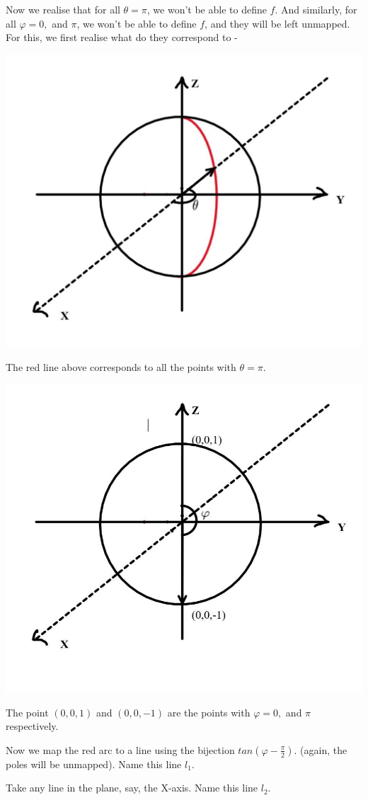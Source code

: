 \documentclass[12pt]{scrartcl}
\begin{document}
Now we realise that for all $\theta = \pi$, we won't be able to define $f$. And similarly, for all $\varphi = 0,$ and $\pi$, we won't be able to define $f$, and they will be left unmapped. For this, we first realise what do they correspond to - 
\begin{center}
    \includegraphics[width=0.7\linewidth]{photo_2020-10-31_16-28-07.jpg}
\end{center}
The red line above corresponds to all the points with $\theta = \pi$.
\begin{center}
    \includegraphics[width=0.7\linewidth]{photo_2020-10-31_16-32-03.jpg}
\end{center}
The point $(0,0,1)$ and $(0,0,-1)$ are the points with $\varphi = 0,$ and $\pi$ respectively.

Now we map the red arc to a line using the bijection $tan(\varphi - \frac{\pi}{2})$. (again, the poles will be unmapped). Name this line $l_1$.

Take any line in the plane, say, the X-axis. Name this line $l_2$.
\end{document}
